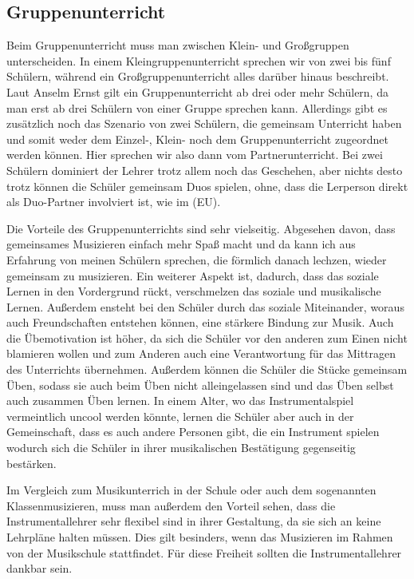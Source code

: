 \subsection{Gruppenunterricht} 
Beim Gruppenunterricht muss man zwischen Klein- und Großgruppen unterscheiden.
In einem Kleingruppenunterricht sprechen wir von zwei bis fünf Schülern, während
ein Großgruppenunterricht alles darüber hinaus beschreibt.
\autocite[219]{grundwissenIP} Laut Anselm Ernst gilt ein Gruppenunterricht ab
drei oder mehr Schülern, da
man
erst ab drei Schülern von einer Gruppe sprechen kann.
\autocite[79]{ernst:die_zukunftsfaehige_musikschule}
Allerdings gibt es zusätzlich noch das Szenario von zwei Schülern, die gemeinsam
Unterricht haben und somit weder dem Einzel-, Klein- noch dem Gruppenunterricht
zugeordnet werden können. Hier sprechen wir also dann vom
Partnerunterricht.\autocite[219]{grundwissenIP} Bei zwei Schülern dominiert der
Lehrer trotz allem
noch das Geschehen, aber nichts desto trotz können die Schüler gemeinsam Duos
spielen, ohne, dass die Lerperson direkt als Duo-Partner involviert ist, wie im
(EU).

Die Vorteile des Gruppenunterrichts sind sehr vielseitig. Abgesehen davon, dass
gemeinsames Musizieren einfach mehr Spaß macht und da kann ich aus Erfahrung von
meinen Schülern sprechen, die förmlich danach lechzen, wieder gemeinsam zu
musizieren. Ein weiterer Aspekt ist, dadurch, dass das soziale
Lernen in den Vordergrund rückt, verschmelzen das soziale und musikalische
Lernen. Außerdem ensteht bei den Schüler durch das soziale Miteinander, woraus
auch Freundschaften entstehen können, eine stärkere Bindung zur Musik. Auch die Übemotivation ist höher, da sich die Schüler vor den anderen
zum Einen nicht blamieren wollen und zum Anderen auch eine Verantwortung für das
Mittragen des Unterrichts übernehmen. Außerdem können die Schüler die Stücke
gemeinsam Üben, sodass sie auch beim Üben nicht alleingelassen sind und das Üben
selbst auch zusammen Üben lernen. In einem Alter, wo das Instrumentalspiel
vermeintlich uncool werden könnte, lernen die Schüler aber auch in der
Gemeinschaft, dass es auch andere Personen gibt, die ein Instrument spielen
wodurch sich die Schüler in ihrer musikalischen Bestätigung gegenseitig
bestärken. 

Im Vergleich zum Musikunterrich in der Schule oder auch dem sogenannten
Klassenmusizieren, muss man außerdem den Vorteil sehen, dass die
Instrumentallehrer sehr flexibel sind in ihrer Gestaltung, da sie sich an keine
Lehrpläne halten müssen. Dies gilt besinders, wenn das Musizieren im Rahmen von
der Musikschule stattfindet. Für diese Freiheit sollten die Instrumentallehrer dankbar sein.

